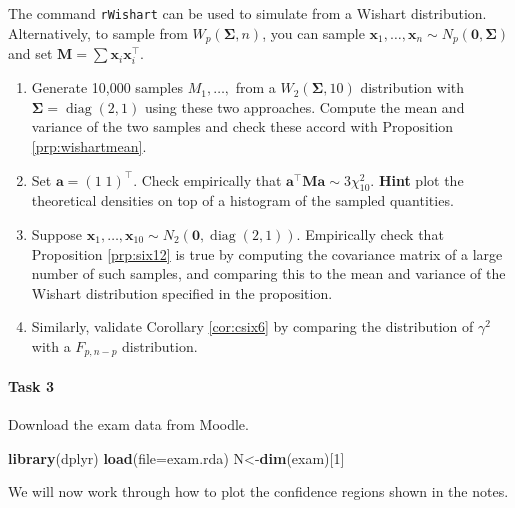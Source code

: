 \documentclass[
]{book}
\newenvironment{Shaded}{\begin{snugshade}}{\end{snugshade}}
\newcommand{\AttributeTok}[1]{\textcolor[rgb]{0.13,0.29,0.53}{#1}}
\newcommand{\DecValTok}[1]{\textcolor[rgb]{0.00,0.00,0.81}{#1}}
\newcommand{\FunctionTok}[1]{\textcolor[rgb]{0.13,0.29,0.53}{\textbf{#1}}}
\newcommand{\NormalTok}[1]{#1}
\newcommand{\OtherTok}[1]{\textcolor[rgb]{0.56,0.35,0.01}{#1}}
\newcommand{\StringTok}[1]{\textcolor[rgb]{0.31,0.60,0.02}{#1}}
\theoremstyle{definition}
\theoremstyle{definition}
\theoremstyle{definition}
\theoremstyle{definition}
\theoremstyle{remark}
\begin{document}
The command \texttt{rWishart} can be used to simulate from a Wishart distribution. Alternatively, to sample from \(W_p(\boldsymbol{\Sigma},n)\), you can sample \(\mathbf x_1, \ldots, \mathbf x_n \sim N_p({\boldsymbol 0}, \boldsymbol{\Sigma})\) and set \(\mathbf M= \sum \mathbf x_i \mathbf x_i^\top\).

\begin{enumerate}
\def\labelenumi{\roman{enumi}.}
\item
  Generate 10,000 samples \(M_1, \ldots,\) from a \(W_2(\boldsymbol{\Sigma}, 10)\) distribution with \(\boldsymbol{\Sigma}= \operatorname{diag}(2,1)\) using these two approaches. Compute the mean and variance of the two samples and check these accord with Proposition \ref{prp:wishartmean}.
\item
  Set \(\mathbf a= (1\; 1)^\top\). Check empirically that \(\mathbf a^\top \mathbf M\mathbf a\sim 3 \chi^2_{10}\).
  \textbf{Hint} plot the theoretical densities on top of a histogram of the sampled quantities.
\item
  Suppose \(\mathbf x_1, \ldots, \mathbf x_{10} \sim N_2({\boldsymbol 0}, \operatorname{diag}(2,1))\). Empirically check that Proposition \ref{prp:six12} is true by computing the covariance matrix of a large number of such samples, and comparing this to the mean and variance of the Wishart distribution specified in the proposition.
\item
  Similarly, validate Corollary \ref{cor:csix6} by comparing the distribution of \(\gamma^2\) with a \(F_{p, n-p}\) distribution.
\end{enumerate}

\hypertarget{task-3-2}{%
\paragraph*{Task 3}\label{task-3-2}}

Download the exam data from Moodle.

\begin{Shaded}
\begin{Highlighting}[]
\FunctionTok{library}\NormalTok{(dplyr)}
\FunctionTok{load}\NormalTok{(}\AttributeTok{file=}\StringTok{\textquotesingle{}exam.rda\textquotesingle{}}\NormalTok{)}
\NormalTok{N}\OtherTok{\textless{}{-}}\FunctionTok{dim}\NormalTok{(exam)[}\DecValTok{1}\NormalTok{]}
\end{Highlighting}
\end{Shaded}

We will now work through how to plot the confidence regions shown in the notes.
\end{document}
